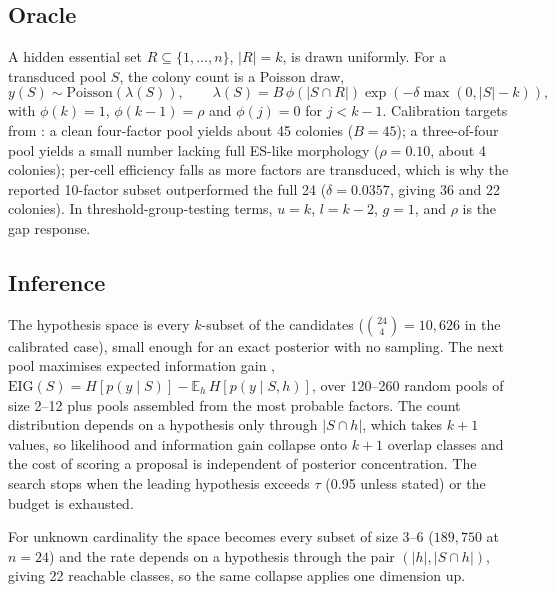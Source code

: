 \documentclass[11pt]{article}
\begin{document}
\subsection{Oracle}

A hidden essential set $R \subseteq \{1,\dots,n\}$, $|R| = k$, is drawn
uniformly. For a transduced pool $S$, the colony count is a Poisson draw,
\begin{equation}
  y(S) \sim \mathrm{Poisson}\!\left(\lambda(S)\right), \qquad
  \lambda(S) = B\, \phi\!\left(|S \cap R|\right)
  \exp\!\left(-\delta \max(0, |S| - k)\right),
  \label{eq:oracle}
\end{equation}
with $\phi(k) = 1$, $\phi(k-1) = \rho$ and $\phi(j) = 0$ for $j < k - 1$.
Calibration targets from \citet{takahashi2006}: a clean four-factor pool yields
about 45 colonies ($B = 45$); a three-of-four pool yields a small number lacking
full ES-like morphology ($\rho = 0.10$, about 4 colonies); per-cell efficiency
falls as more factors are transduced, which is why the reported 10-factor subset
outperformed the full 24 ($\delta = 0.0357$, giving 36 and 22 colonies). In
threshold-group-testing terms, $u = k$, $l = k - 2$, $g = 1$, and $\rho$ is the
gap response.

\subsection{Inference}
\label{sec:methods-inference}

The hypothesis space is every $k$-subset of the candidates
($\binom{24}{4} = 10{,}626$ in the calibrated case), small enough for an exact
posterior with no sampling. The next pool maximises expected information gain
\citep{lindley1956},
$\mathrm{EIG}(S) = H[p(y \mid S)] - \mathbb{E}_{h}\,H[p(y \mid S, h)]$,
over 120--260 random pools of size 2--12 plus pools assembled from the most
probable factors. The count distribution depends on a hypothesis only through
$|S \cap h|$, which takes $k + 1$ values, so likelihood and information gain
collapse onto $k+1$ overlap classes and the cost of scoring a proposal is
independent of posterior concentration. The search stops when the leading
hypothesis exceeds $\tau$ (0.95 unless stated) or the budget is exhausted.

For unknown cardinality the space becomes every subset of size 3--6
($189{,}750$ at $n = 24$) and the rate depends on a hypothesis through the pair
$(|h|, |S \cap h|)$, giving 22 reachable classes, so the same collapse applies
one dimension up.
\end{document}
